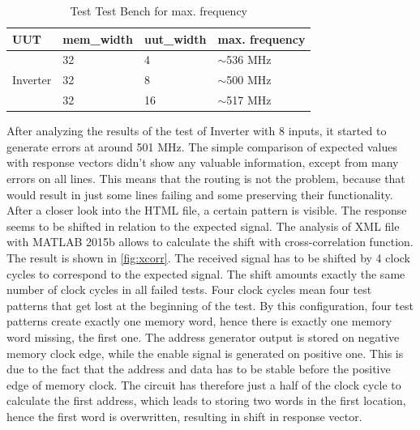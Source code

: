 \begin{table}[h]
\label{tab:max_freq}
\begin{tabular}{@{}llll@{}}
\toprule
UUT                       &mem\_width   &uut\_width &max. frequency \\ 
\midrule
\multirow{3}{*}{Inverter} &32           &4       & $\sim$536 MHz\\ 
                          & 32          & 8      & $\sim$500 MHz \\  
                          & 32          & 16     & $\sim$517 MHz \\ 
\bottomrule
\end{tabular}
\centering
\caption{Test Test Bench for max. frequency}
\end{table}

After analyzing the results of the test of Inverter with 8 inputs, it started to generate errors at around 501 MHz. The simple comparison of expected values with response vectors didn't show any valuable information, except from many errors on all lines. This means that the routing is not the problem, because that would result in just some lines failing and some preserving their functionality. After a closer look into the HTML file, a certain pattern is visible. The response seems to be shifted in relation to the expected signal. The analysis of XML file with MATLAB 2015b allows to calculate the shift with cross-correlation function. The result is shown in \autoref{fig:xcorr}. The received signal has to be shifted by 4 clock cycles to correspond to the expected signal. The shift amounts exactly the same number of clock cycles in all failed tests. Four clock cycles mean four test patterns that get lost at the beginning of the test. By this configuration, four test patterns create exactly one memory word, hence there is exactly one memory word missing, the first one. The address generator output is stored on negative memory clock edge, while the enable signal is generated on positive one. This is due to the fact that the address and data has to be stable before the positive edge of memory clock. The circuit has therefore just a half of the clock cycle to calculate the first address, which leads to storing two words in the first location, hence the first word is overwritten, resulting in shift in response vector.

